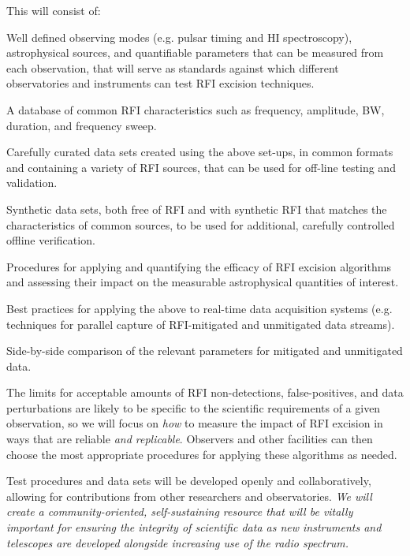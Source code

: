 \documentclass[10pt]{myNSF}
\begin{document}
This will consist of:
\vspace{-1.0em}
\begin{itemize*}
\item{Well defined observing modes (e.g. pulsar timing and H{\sc I}
  spectroscopy), astrophysical sources, and quantifiable parameters
  that can be measured from each observation, that will serve as
  standards against which different observatories and instruments can
  test RFI excision techniques.}
\item{A database of common RFI characteristics such as frequency,
  amplitude, BW, duration, and frequency sweep.}
\item{Carefully curated data sets created using the above set-ups, in
  common formats and containing a variety of RFI sources, that can be
  used for off-line testing and validation.}
\item{Synthetic data sets, both free of RFI and with synthetic RFI that
    matches the characteristics of common sources, to be used for
    additional, carefully controlled offline verification.}
\item{Procedures for applying and quantifying the efficacy of RFI
  excision algorithms and assessing their impact on the measurable
  astrophysical quantities of interest.}
\item{Best practices for applying the above to real-time data
  acquisition systems (e.g. techniques for parallel capture of
  RFI-mitigated and unmitigated data streams).}
\item{Side-by-side comparison of the relevant parameters for mitigated
  and unmitigated data.}
\end{itemize*}
\vspace{-1.0em}
The limits for acceptable amounts of RFI non-detections,
false-positives, and data perturbations are likely to be specific to
the scientific requirements of a given observation, so we will focus
on \emph{how} to measure the impact of RFI excision in ways that are
reliable \emph{and replicable}.  Observers and other facilities can
then choose the most appropriate procedures for applying these
algorithms as needed.

Test procedures and data sets will be developed openly and
collaboratively, allowing for contributions from other researchers and
observatories.  \emph{We will create a community-oriented,
  self-sustaining resource that will be vitally important for ensuring
  the integrity of scientific data as new instruments and telescopes
  are developed alongside increasing use of the radio spectrum.}
\end{document}
